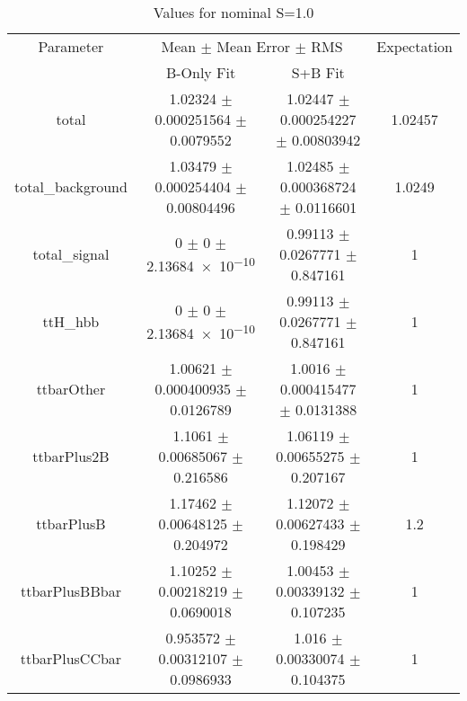 \begin{table}
\centering
\caption{Values for nominal S=1.0}
\begin{tabular}{cccc}
\toprule
Parameter & \multicolumn{2}{c}{Mean $\pm$ Mean Error $\pm$ RMS} & Expectation\\
 & B-Only Fit & S+B Fit & \\
\midrule
total & \num{1.02324} $\pm$ \num{0.000251564} $\pm$ \num{0.0079552} & \num{1.02447} $\pm$ \num{0.000254227} $\pm$ \num{0.00803942} & \num{1.02457}\\
total\_background & \num{1.03479} $\pm$ \num{0.000254404} $\pm$ \num{0.00804496} & \num{1.02485} $\pm$ \num{0.000368724} $\pm$ \num{0.0116601} & \num{1.0249}\\
total\_signal & \num{0} $\pm$ \num{0} $\pm$ \num{2.13684e-10} & \num{0.99113} $\pm$ \num{0.0267771} $\pm$ \num{0.847161} & \num{1}\\
ttH\_hbb & \num{0} $\pm$ \num{0} $\pm$ \num{2.13684e-10} & \num{0.99113} $\pm$ \num{0.0267771} $\pm$ \num{0.847161} & \num{1}\\
ttbarOther & \num{1.00621} $\pm$ \num{0.000400935} $\pm$ \num{0.0126789} & \num{1.0016} $\pm$ \num{0.000415477} $\pm$ \num{0.0131388} & \num{1}\\
ttbarPlus2B & \num{1.1061} $\pm$ \num{0.00685067} $\pm$ \num{0.216586} & \num{1.06119} $\pm$ \num{0.00655275} $\pm$ \num{0.207167} & \num{1}\\
ttbarPlusB & \num{1.17462} $\pm$ \num{0.00648125} $\pm$ \num{0.204972} & \num{1.12072} $\pm$ \num{0.00627433} $\pm$ \num{0.198429} & \num{1.2}\\
ttbarPlusBBbar & \num{1.10252} $\pm$ \num{0.00218219} $\pm$ \num{0.0690018} & \num{1.00453} $\pm$ \num{0.00339132} $\pm$ \num{0.107235} & \num{1}\\
ttbarPlusCCbar & \num{0.953572} $\pm$ \num{0.00312107} $\pm$ \num{0.0986933} & \num{1.016} $\pm$ \num{0.00330074} $\pm$ \num{0.104375} & \num{1}\\
\bottomrule
\end{tabular}
\end{table}
